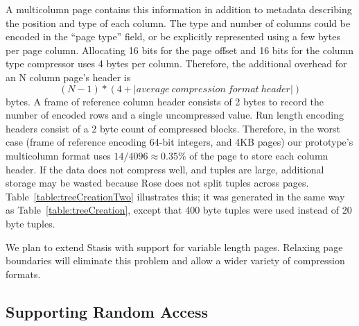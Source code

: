 \documentclass{vldb}
\newcommand{\rows}{Rose\xspace}
\newcommand{\rowss}{Rose's\xspace}
\begin{document}
A multicolumn page contains this information in addition to metadata
describing the position and type of each column.  The type and number
of columns could be encoded in the ``page type'' field, or be
explicitly represented using a few bytes per page column.  Allocating
16 bits for the page offset and 16 bits for the column type compressor
uses 4 bytes per column.  Therefore, the additional overhead for an N
column page's header is
\[
   (N-1) * (4 + |average~compression~format~header|)
\]
bytes.  A frame of reference column header consists of 2 bytes to
record the number of encoded rows and a single uncompressed
value. Run length encoding headers consist of a 2 byte count of
compressed blocks.  Therefore, in the worst case (frame of reference
encoding 64-bit integers, and 4KB pages) our prototype's
multicolumn format uses $14/4096\approx0.35\%$ of the page to store
each column header.  If the data does not compress well, and tuples
are large, additional storage may be wasted because \rows does not
split tuples across pages.  Table~\ref{table:treeCreationTwo}
illustrates this; it was generated in the same way
as Table~\ref{table:treeCreation}, except that 400 byte tuples were 
used instead of 20 byte tuples.

We plan to extend Stasis with support for variable length pages.
Relaxing page boundaries will eliminate this problem and allow a wider
variety of compression formats.




\subsection{Supporting Random Access}
\end{document}
